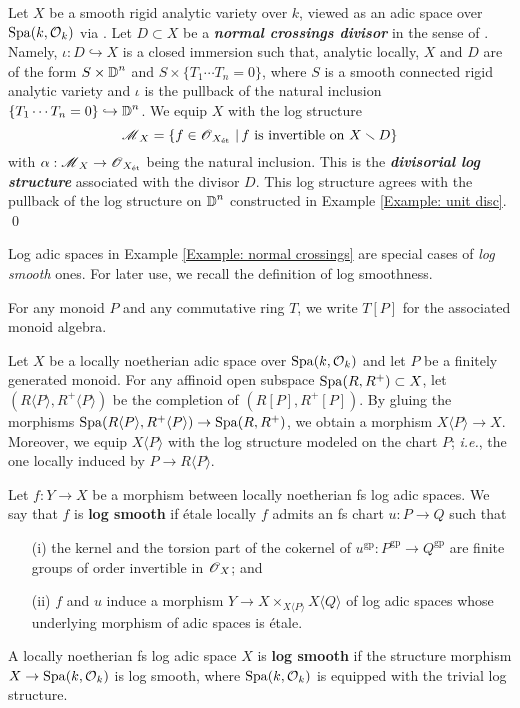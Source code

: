 \begin{Example}\label{Example: normal crossings}
\normalfont Let $X$ be a smooth rigid analytic variety over $k$, viewed as an adic space over $\operatorname{Spa}(k, \operatorname{\mathcal{O}}_k)$ via \cite[(1.1.11)]{Huber-2013}. Let $D\subset X$ be a \textit{\textbf{normal crossings divisor}} in the sense of \cite[Example 2.3.17]{Diao}. Namely, $\iota:D\hookrightarrow X$ is a closed immersion such that, analytic locally, $X$ and $D$ are of the form $S\times \operatorname{\mathbb{D}}^n$ and $S\times \{T_1\cdots T_n=0\}$, where $S$ is a smooth connected rigid analytic variety and $\iota$ is the pullback of the natural inclusion $\{T_1\cdots T_n=0\}\hookrightarrow \operatorname{\mathbb{D}}^n$. We equip $X$ with the log structure 
\[\operatorname{\mathscr{M}}_{X}=\{f\in \operatorname{\mathscr{O}}_{X_{\operatorname{\textrm{\'{e}t}}}}\,|\, f \textrm{ is invertible on }X\smallsetminus D\}\]
with $\alpha:\operatorname{\mathscr{M}}_{X}\rightarrow \operatorname{\mathscr{O}}_{X_{\operatorname{\textrm{\'{e}t}}}}$ being the natural inclusion. This is the \textit{\textbf{divisorial log structure}} associated with the divisor $D$. This log structure agrees with the pullback of the log structure on $\operatorname{\mathbb{D}}^n$ constructed in Example \ref{Example: unit disc}. \qed
\end{Example}

Log adic spaces in Example \ref{Example: normal crossings} are special cases of \emph{log smooth} ones. For later use, we recall the definition of log smoothness.

For any monoid $P$ and any commutative ring $T$, we write $T[P]$ for the associated monoid algebra.

\begin{Definition}
Let $X$ be a locally noetherian adic space over $\operatorname{Spa}(k, \operatorname{\mathcal{O}}_k)$ and let $P$ be a finitely generated monoid. For any affinoid open subspace $\operatorname{Spa}(R, R^+)\subset X$, let $(R\langle P\rangle, R^+\langle P\rangle)$ be the completion of $(R[P], R^+[P])$. By gluing the morphisms $\operatorname{Spa}(R\langle P\rangle, R^+\langle P\rangle)\rightarrow \operatorname{Spa}(R, R^+)$, we obtain a morphism $X\langle P\rangle\rightarrow X$. Moreover, we equip $X\langle P\rangle$ with the log structure modeled on the chart $P$; \emph{i.e.}, the one locally induced by $P\rightarrow R\langle P\rangle$.
\end{Definition}

\begin{Definition}\label{Definition: log smooth}
Let $f: Y\rightarrow X$ be a morphism between locally noetherian fs log adic spaces. We say that $f$ is \textbf{log smooth} if \'etale locally $f$ admits an fs chart $u:P\rightarrow Q$ such that
\begin{enumerate}
\item[(i)] the kernel and the torsion part of the cokernel of $u^{\mathrm{gp}}:P^{\mathrm{gp}}\rightarrow Q^{\mathrm{gp}}$ are finite groups of order invertible in $\operatorname{\mathscr{O}}_X$; and
\item[(ii)] $f$ and $u$ induce a morphism $Y\rightarrow X\times_{X\langle P\rangle}X\langle Q\rangle$ of log adic spaces whose underlying morphism of adic spaces is \'etale.
\end{enumerate}
A locally noetherian fs log adic space $X$ is \textbf{log smooth} if the structure morphism $X\rightarrow \operatorname{Spa}(k, \operatorname{\mathcal{O}}_k)$ is log smooth, where $\operatorname{Spa}(k, \operatorname{\mathcal{O}}_k)$ is equipped with the trivial log structure.
\end{Definition}

